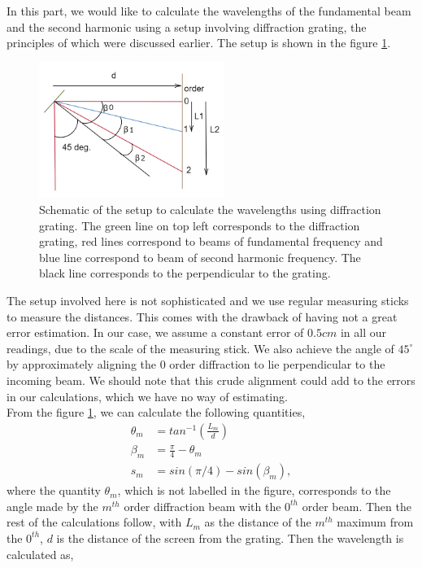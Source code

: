 In this part, we would like to calculate the wavelengths of the fundamental beam and the second harmonic using a setup involving diffraction grating, the principles of which were discussed earlier. The setup is shown in the figure \ref{fig:diffgrat}.
\begin{figure}
    \centering
    \includegraphics[width = 6cm]{diffgrat.png}
    \caption{Schematic of the setup to calculate the wavelengths using diffraction grating. The green line on top left corresponds to the diffraction grating, red lines correspond to beams of fundamental frequency and blue line correspond to beam of second harmonic frequency. The black line corresponds to the perpendicular to the grating.}
    \label{fig:diffgrat}
\end{figure}
The setup involved here is not sophisticated and we use regular measuring sticks to measure the distances. This comes with the drawback of having not a great error estimation. In our case, we assume a constant error of $0.5cm$ in all our readings, due to the scale of the measuring stick. We also achieve the angle of $45^{\circ}$ by approximately aligning the $0$ order diffraction to lie perpendicular to the incoming beam. We should note that this crude alignment could add to the errors in our calculations, which we have no way of estimating.\\
From the figure \ref{fig:diffgrat}, we can calculate the following quantities,
\begin{equation}
\begin{split}
    \theta_m &= tan^{-1}\left(\frac{L_m}{d}\right) \\
    \beta_m &= \frac{\pi}{4} - \theta_m \\
    s_m &= sin(\pi/4) - sin(\beta_m),
\end{split}
\end{equation}
where the quantity $\theta_m$, which is not labelled in the figure, corresponds to the angle made by the $m^{th}$ order diffraction beam with the $0^{th}$ order beam. Then the rest of the calculations follow, with $L_m$ as the distance of the $m^{th}$ maximum from the $0^{th}$, $d$ is the distance of the screen from the grating. Then the wavelength is calculated as,
